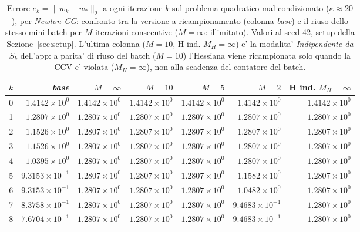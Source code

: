 \begin{table}[H]
\centering
\footnotesize
\renewcommand{\arraystretch}{0.85}
\setlength{\tabcolsep}{2pt}
\caption{Errore $e_k=\|w_k-w_*\|_2$ a ogni iterazione $k$ sul problema quadratico mal condizionato ($\kappa\approx 20$), per \emph{Newton-CG}: confronto tra la versione a ricampionamento (colonna \emph{base}) e il riuso dello stesso mini-batch per $M$ iterazioni consecutive ($M=\infty$: illimitato). Valori al seed 42, setup della Sezione~\ref{sec:setup}. L'ultima colonna ($M{=}10$, H ind. $M_H{=}\infty$) e' la modalita' \emph{Indipendente da $S_k$} dell'app: a parita' di riuso del batch ($M=10$) l'Hessiana viene ricampionata solo quando la CCV e' violata ($M_H=\infty$), non alla scadenza del contatore del batch.}
\label{tab:riuso_malcond_ncg}
\begin{tabular}{@{}rrrrrrr@{}}
\toprule
$k$ & \emph{base} & $M{=}\infty$ & $M{=}10$ & $M{=}5$ & $M{=}2$ & H ind. $M_H{=}\infty$\\
\midrule
0 & $1.4142\times10^{0}$ & $1.4142\times10^{0}$ & $1.4142\times10^{0}$ & $1.4142\times10^{0}$ & $1.4142\times10^{0}$ & $1.4142\times10^{0}$\\
1 & $1.2807\times10^{0}$ & $1.2807\times10^{0}$ & $1.2807\times10^{0}$ & $1.2807\times10^{0}$ & $1.2807\times10^{0}$ & $1.2807\times10^{0}$\\
2 & $1.1526\times10^{0}$ & $1.2807\times10^{0}$ & $1.2807\times10^{0}$ & $1.2807\times10^{0}$ & $1.2807\times10^{0}$ & $1.2807\times10^{0}$\\
3 & $1.1526\times10^{0}$ & $1.2807\times10^{0}$ & $1.2807\times10^{0}$ & $1.2807\times10^{0}$ & $1.2807\times10^{0}$ & $1.2807\times10^{0}$\\
4 & $1.0395\times10^{0}$ & $1.2807\times10^{0}$ & $1.2807\times10^{0}$ & $1.2807\times10^{0}$ & $1.2807\times10^{0}$ & $1.2807\times10^{0}$\\
5 & $9.3153\times10^{-1}$ & $1.2807\times10^{0}$ & $1.2807\times10^{0}$ & $1.2807\times10^{0}$ & $1.1582\times10^{0}$ & $1.2807\times10^{0}$\\
6 & $9.3153\times10^{-1}$ & $1.2807\times10^{0}$ & $1.2807\times10^{0}$ & $1.2807\times10^{0}$ & $1.0482\times10^{0}$ & $1.2807\times10^{0}$\\
7 & $8.3758\times10^{-1}$ & $1.2807\times10^{0}$ & $1.2807\times10^{0}$ & $1.2807\times10^{0}$ & $9.4683\times10^{-1}$ & $1.2807\times10^{0}$\\
8 & $7.6704\times10^{-1}$ & $1.2807\times10^{0}$ & $1.2807\times10^{0}$ & $1.2807\times10^{0}$ & $9.4683\times10^{-1}$ & $1.2807\times10^{0}$\\

\end{tabular}
\end{table}
